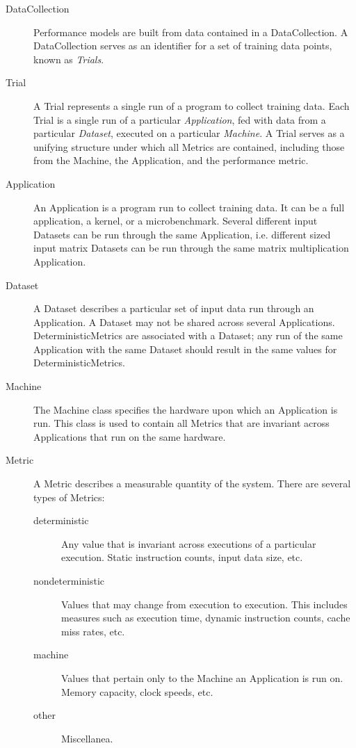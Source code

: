 \begin{description}
\item[DataCollection]Performance models are built from data contained in a
DataCollection. A DataCollection serves as an identifier for a set of training
data points, known as {\em Trials}.

\item[Trial] A Trial represents a single run of a program to collect training data.
Each Trial is a single run of a particular {\em Application}, fed with data from a
particular {\em Dataset}, executed on a particular {\em Machine}.
A Trial serves as a unifying structure under which all
Metrics are contained, including those from the Machine, the Application, and
the performance metric.

\item[Application] An Application is a program run to collect training data. It can
be a full application, a kernel, or a microbenchmark.  Several different input
Datasets can be run through the same Application, i.e. different sized input
matrix Datasets can be run through the same matrix multiplication Application.

\item[Dataset] A Dataset describes a particular set of input data run through an
Application. A Dataset may not be shared across several Applications.
DeterministicMetrics are associated with a Dataset; any run of the same
Application with the same Dataset should result in the same values for
DeterministicMetrics.

\item[Machine] The Machine class specifies the hardware upon which an Application is
run. This class is used to contain all Metrics that are invariant across
Applications that run on the same hardware.

\item[Metric] A Metric describes a measurable quantity of the system. 
There are several types of Metrics:
	\begin{description}
	\item[deterministic] Any value that is invariant across executions of a
		particular execution. Static instruction counts, input 
		data size, etc.
	\item[nondeterministic] Values that may change from execution to execution.
        This includes measures such as execution time, dynamic instruction
        counts, cache miss rates, etc.
	\item[machine] Values that pertain only to the Machine an Application is run
		on. Memory capacity, clock speeds, etc.
	\item[other] Miscellanea. 
	\end{description}


\end{description}
